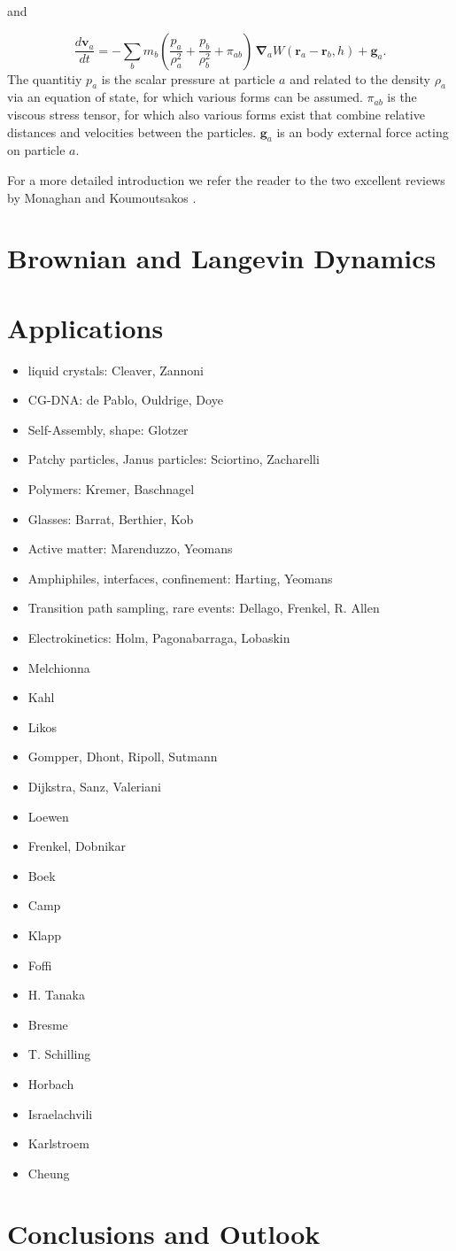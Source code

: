 \documentclass[8.5pt,twoside,twocolumn]{article}
\newcommand{\beq}{\begin{equation}}
\newcommand{\eeq}{\end{equation}}
\newcommand{\bit}{\begin{itemize}}
\newcommand{\eit}{\end{itemize}}
\begin{document}
and

\beq
\frac{d\mathbf{v}_a}{dt}=-\sum_b m_b (\frac{p_a}{\rho_a^2}+\frac{p_b}{\rho_b^2} + \pi_{a b})\,\mathbf{\nabla}_a W(\mathbf{r}_a-\mathbf{r}_b,h) + \mathbf{g}_a.
\eeq	
The quantitiy $p_a$ is the scalar pressure at particle $a$ and 
related to the density $\rho_a$ via an equation of state, for 
which various forms can be assumed. $\pi_{a b}$ is the viscous 
stress tensor, for which also various forms exist that combine
relative distances and velocities between the particles. $\mathbf{g}_a$ 
is an body external force acting on particle $a$.

For a more detailed introduction we refer the reader to the two
excellent reviews by Monaghan \cite{Monaghan:2012} and Koumoutsakos \cite{Koumoutsakos:2005}.

\section{Brownian and Langevin Dynamics}

\section{Applications}

\bit
\item liquid crystals: Cleaver, Zannoni
\item CG-DNA: de Pablo, Ouldrige, Doye 
\item Self-Assembly, shape: Glotzer 
\item Patchy particles, Janus particles: Sciortino, Zacharelli 
\item Polymers: Kremer, Baschnagel
\item Glasses: Barrat, Berthier, Kob 
\item Active matter: Marenduzzo, Yeomans
\item Amphiphiles, interfaces, confinement: Harting, Yeomans 
\item Transition path sampling, rare events: Dellago, Frenkel, R. Allen
\item Electrokinetics: Holm, Pagonabarraga, Lobaskin
\item Melchionna
\item Kahl
\item Likos
\item Gompper, Dhont, Ripoll, Sutmann
\item Dijkstra, Sanz, Valeriani
\item Loewen
\item Frenkel, Dobnikar
\item Boek
\item Camp
\item Klapp
\item Foffi
\item H. Tanaka
\item Bresme
\item T. Schilling
\item Horbach
\item Israelachvili
\item Karlstroem
\item Cheung
\eit

\section{Conclusions and Outlook}



\footnotesize{
}
\end{document}
